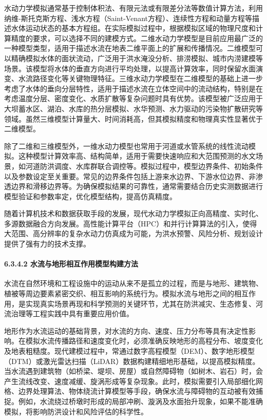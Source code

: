 水动力学模拟通常基于控制体积法、有限元法或有限差分法等数值计算方法，利用纳维-斯托克斯方程、浅水方程（Saint-Venant方程）、连续性方程和动量方程等描述水体运动状态的基本方程组。在实际模拟过程中，根据模拟区域的物理尺度和计算精度的要求，可以选择不同的建模方式。二维水动力学模型是目前应用最广泛的一种模型类型，适用于描述水流在地表二维平面上的扩展和传播情况。二维模型可以精确模拟水体的面状流动，广泛用于洪水淹没分析、排涝模拟、城市内涝建模等场景。该模型将水体的垂直方向进行平均处理，以提高计算效率，同时保留水面演变、水流路径变化等关键物理特征。三维水动力学模型在二维模型的基础上进一步考虑了水体的垂向分层特性，适用于描述水流在立体空间中的流动结构，特别是在考虑温度分层、密度变化、水质扩散等复杂问题时具有优势。该模型被广泛应用于大坝蓄水区、湖泊、水库的热分层模拟、水华预测、水力驱动的污染物扩散研究等领域。虽然三维模型计算量大、时间消耗高，但其模拟精度和物理真实性显著优于二维模型。

除了二维和三维模型外，一维水动力模型也常用于河道或水管系统的线性流动模拟。这种模型计算效率高、结构简单，适用于需要快速响应和大范围预测的水文场景，如河道防洪调度、水库群联合调控等。模拟过程中，模型边界条件、初始条件以及参数设定至关重要。常见的边界条件包括上游来水边界、下游水位边界、非渗透边界和滑移边界等。为确保模拟结果的可靠性，通常需要结合历史实测数据进行模型验证和参数率定，优化模型结构，提高仿真精度。

随着计算机技术和数据获取手段的发展，现代水动力学模拟正向高精度、实时化、多源数据融合方向发展。高性能计算平台（HPC）和并行计算算法的引入，使得大范围、高分辨率的复杂水动力仿真成为可能，为洪水预警、风险分析、规划设计提供了强有力的技术支撑。

\hypertarget{ux6c34ux6d41ux4e0eux5730ux5f62ux76f8ux4e92ux4f5cux7528ux6a21ux578bux6784ux5efaux65b9ux6cd5}{%
\paragraph{6.3.4.2 水流与地形相互作用模型构建方法}\label{ux6c34ux6d41ux4e0eux5730ux5f62ux76f8ux4e92ux4f5cux7528ux6a21ux578bux6784ux5efaux65b9ux6cd5}}

水流在自然环境和工程设施中的运动从来不是孤立的过程，而是与地形、建筑物、植被等周边要素紧密交织、相互影响的系统行为。模拟水流与地形之间的相互作用，是实现真实场景再现和科学预测的关键环节，尤其在防洪减灾、生态修复、河流治理等工程实践中具有重要应用价值。

地形作为水流运动的基础背景，对水流的方向、速度、压力分布等具有决定性影响。在模拟水流传播路径和速度变化时，必须准确反映地形的高程分布、坡度变化及地表粗糙度。现代建模过程中，常通过数字高程模型（DEM）、数字地形模型（DTM）或激光雷达扫描（LiDAR）数据构建精细地形基础，以提高模拟精度。当水流遇到建筑物（如桥梁、堤坝、房屋）或自然障碍物（如树木、岩石）时，会产生流线改变、速度减缓、旋涡形成等复杂现象。此时，模拟需要引入局部细化网格、边界处理算法、物体绕流计算模型等手段，确保水流与障碍物的互动被有效捕捉。例如，水流绕过桥墩时形成的局部冲刷、漩涡及水面抬升现象，如果不能准确模拟，将影响防洪设计和风险评估的科学性。


